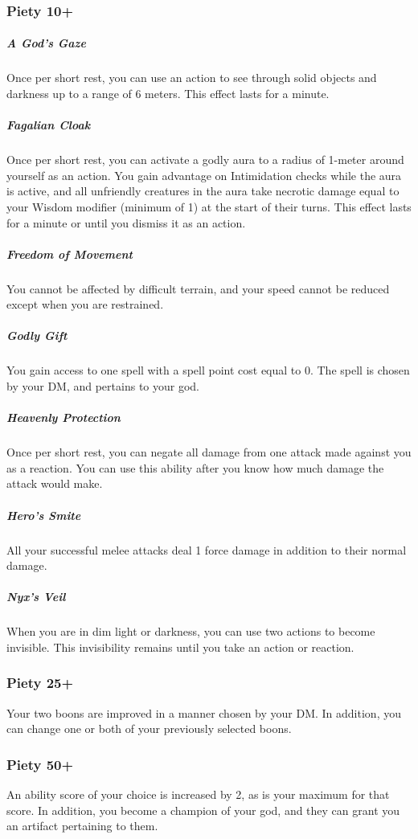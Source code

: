 \pagebreak

\subsubsection{Piety 10+}
    \subparagraph{A God's Gaze}
        Once per short rest, you can use an action to see through solid objects and darkness up to a range of 6 meters.
        This effect lasts for a minute.
    \subparagraph{Fagalian Cloak}
        Once per short rest, you can activate a godly aura to a radius of 1-meter around yourself as an action.
        You gain advantage on Intimidation checks while the aura is active, and all unfriendly creatures in the aura take necrotic damage equal to your Wisdom modifier (minimum of 1) at the start of their turns.
        This effect lasts for a minute or until you dismiss it as an action.
    \subparagraph{Freedom of Movement}
        You cannot be affected by difficult terrain, and your speed cannot be reduced except when you are restrained.
    \subparagraph{Godly Gift}
        You gain access to one spell with a spell point cost equal to 0.
        The spell is chosen by your DM, and pertains to your god.
    \subparagraph{Heavenly Protection}
        Once per short rest, you can negate all damage from one attack made against you as a reaction.
        You can use this ability after you know how much damage the attack would make.
    \subparagraph{Hero's Smite}
        All your successful melee attacks deal 1 force damage in addition to their normal damage.
    \subparagraph{Nyx's Veil}
        When you are in dim light or darkness, you can use two actions to become invisible.
        This invisibility remains until you take an action or reaction.

\subsubsection{Piety 25+}
    Your two boons are improved in a manner chosen by your DM.
    In addition, you can change one or both of your previously selected boons.

\subsubsection{Piety 50+}
    An ability score of your choice is increased by 2, as is your maximum for that score.
    In addition, you become a champion of your god, and they can grant you an artifact pertaining to them.

\pagebreak
